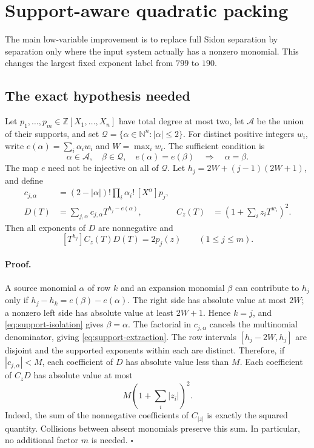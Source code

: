 \section{Support-aware quadratic packing}
The main low-variable improvement is to replace full Sidon separation by
separation only where the input system actually has a nonzero monomial.
This changes the largest fixed exponent label from $799$ to $190$.

\subsection{The exact hypothesis needed}
Let $p_1,\ldots,p_m\in\mathbb Z[X_1,\ldots,X_n]$ have total degree at most
two, let $\mathcal A$ be the union of their supports, and set
$\mathcal Q=\{\alpha\in\mathbb N^n:|\alpha|\leq2\}$.
For distinct positive integers $w_i$, write
$e(\alpha)=\sum_i\alpha_iw_i$ and $W=\max_iw_i$.
The sufficient condition is
\begin{equation}\label{eq:support-isolation}
 \alpha\in\mathcal A,\quad\beta\in\mathcal Q,\quad
 e(\alpha)=e(\beta)\quad\Longrightarrow\quad\alpha=\beta.
\end{equation}
The map $e$ need not be injective on all of $\mathcal Q$.
Let $h_j=2W+(j-1)(2W+1)$, and define
\begin{align*}
 c_{j,\alpha}&=(2-|\alpha|)!\prod_i\alpha_i!\,[X^\alpha]p_j,\\
 D(T)&=\sum_{j,\alpha}c_{j,\alpha}T^{h_j-e(\alpha)},&
 C_z(T)&=\left(1+\sum_i z_iT^{w_i}\right)^2.
\end{align*}
Then all exponents of $D$ are nonnegative and
\begin{equation}\label{eq:support-extraction}
 [T^{h_j}]C_z(T)D(T)=2p_j(z)
 \qquad(1\leq j\leq m).
\end{equation}

\paragraph{Proof.}
A source monomial $\alpha$ of row $k$ and an expansion monomial $\beta$
can contribute to $h_j$ only if
$h_j-h_k=e(\beta)-e(\alpha)$.
The right side has absolute value at most $2W$; a nonzero left side has
absolute value at least $2W+1$. Hence $k=j$, and
\eqref{eq:support-isolation} gives $\beta=\alpha$.
The factorial in $c_{j,\alpha}$ cancels the multinomial denominator,
giving \eqref{eq:support-extraction}. The row intervals
$[h_j-2W,h_j]$ are disjoint and the supported exponents within each are
distinct. Therefore, if $|c_{j,\alpha}|<M$, each coefficient of $D$ has
absolute value less than $M$. Each coefficient of $C_zD$ has absolute
value at most
\begin{equation}\label{eq:support-bound}
 M\left(1+\sum_i|z_i|\right)^2.
\end{equation}
Indeed, the sum of the nonnegative coefficients of $C_{|z|}$ is exactly
the squared quantity. Collisions between absent monomials preserve this
sum. In particular, no additional factor $m$ is needed.
\hfill$\square$

